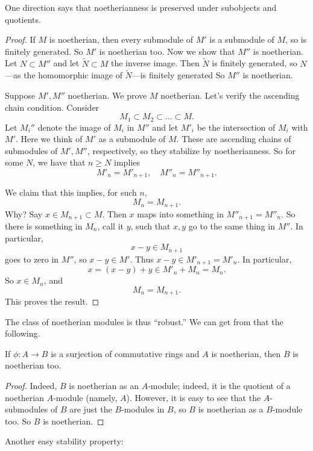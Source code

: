 One direction says that noetherianness is preserved under subobjects and
quotients.
\begin{proof} 
If $M$ is noetherian, then every submodule of $M'$ is a submodule of $M$, so is
finitely generated. So $M'$ is noetherian too. Now we show that $M''$ is
noetherian. Let $N \subset M''$ and let
$\widetilde{N} \subset M$ the inverse image. Then $\widetilde{N}$ is finitely generated, so
$N$---as the homomorphic image of $\widetilde{N}$---is finitely generated 
So $M''$ is noetherian.

Suppose $M', M''$ noetherian. We prove $M$ noetherian.
Let's verify the ascending chain condition. Consider
\[ M_1 \subset M_2 \subset \dots \subset M.  \]
Let $M_i''$ denote the image of $M_i$ in $M''$ and let $M'_i$ be the
intersection of $M_i$ with $M'$. Here we think of $M'$ as a submodule of $M$.
These are ascending chains of submodules of $M', M''$, respectively, so they
stabilize by noetherianness.
So for some $N$, we have
that $n \geq N$ implies 
\[ M'_n = M'_{n+1}, \quad M''_n = M''_{n+1}.  \]

We claim that this implies, for such $n$, 
\[ M_n = M_{n+1}.  \]
Why? Say $x \in M_{n+1} \subset M$. Then $x$ maps into something in $M''_{n+1} = M''_n$.  
So there is something in $M_n$, call it $y$, such that $x,y$ go to the same
thing in $M''$. In particular, 
\[ x - y \in M_{n+1} \]
goes to zero in $M''$, so $x-y \in M'$. Thus $x-y \in M'_{n+1} = M'_n$. In
particular, 
\[ x = (x-y) + y \in M'_n + M_n = M_n.  \]
So $x \in M_n$, and 
\[ M_n = M_{n+1} . \]
This proves the result.
\end{proof} 

The class of noetherian modules is thus ``robust.'' We can get from that the
following.

\begin{proposition} 
If $\phi: A \to B$ is a surjection of commutative rings and $A$ is noetherian, then $B$ is
noetherian too.
\end{proposition} 
\begin{proof} 
Indeed, $B$ is noetherian as an $A$-module; indeed, it is the quotient of a
noetherian $A$-module (namely, $A$). However, it is easy to see that the
$A$-submodules of $B$ are just the $B$-modules in $B$, so $B$ is noetherian as a
$B$-module too. So $B$ is noetherian.  
\end{proof} 

Another easy stability property:

